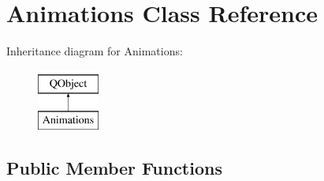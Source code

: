 \hypertarget{class_animations}{}\section{Animations Class Reference}
\label{class_animations}
Inheritance diagram for Animations\+:\begin{figure}[H]
\begin{center}
\leavevmode
\includegraphics[height=2.000000cm]{class_animations}
\end{center}
\end{figure}
\subsection*{Public Member Functions}
